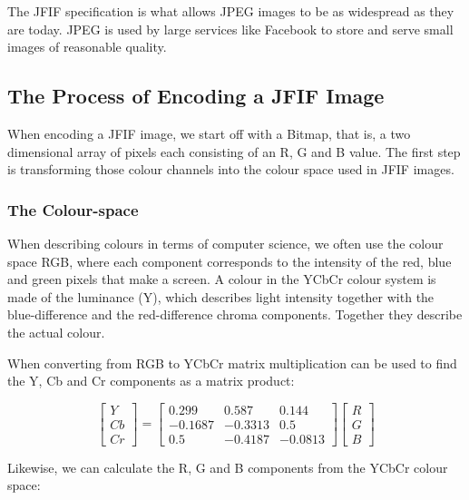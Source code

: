\begin{infobox}
The JFIF specification is what allows JPEG images to be as widespread as they are today.
JPEG is used by large services like Facebook to store and serve small images of reasonable quality.

\vspace{4mm}
\subsection{The Process of Encoding a JFIF Image}
\vspace{-2.5mm}
When encoding a JFIF image, we start off with a Bitmap, that is, a two dimensional array of pixels each consisting of an R, G and B value.
The first step is transforming those colour channels into the colour space used in JFIF images. 

\vspace{4mm}
\subsubsection{The Colour-space}
\vspace{-2.5mm}
When describing colours in terms of computer science, we often use the colour space RGB, where each component corresponds to the intensity of the red, blue and green pixels that make a screen. 
A colour in the YCbCr colour system is made of the luminance (Y), which describes light intensity together with the blue-difference and the red-difference chroma components.
Together they describe the actual colour.

When converting from RGB to YCbCr matrix multiplication can be used to find the Y, Cb and Cr components as a matrix product:

$$\begin{bmatrix}
	Y\\Cb\\Cr
\end{bmatrix} = \begin{bmatrix}
	0.299 & 0.587 & 0.144\\
	-0.1687 & -0.3313 & 0.5\\
	0.5 & -0.4187 & -0.0813
\end{bmatrix}\begin{bmatrix}
	R\\G\\B
\end{bmatrix}$$

Likewise, we can calculate the R, G and B components from the YCbCr colour space:


\end{infobox}
